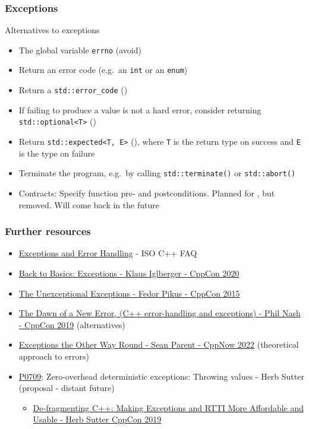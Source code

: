 \begin{frame}[fragile]
  \frametitle{Exceptions}
  \begin{block}{Alternatives to exceptions}
    \begin{itemize}
      \item The global variable \texttt{errno} (avoid)
      \item Return an error code (e.g.\ an \texttt{int} or an \texttt{enum})
      \item Return a \texttt{std::error_code} ()
      \item If failing to produce a value is not a hard error, consider returning \texttt{std::optional<T>} ()
      \item Return \texttt{std::expected<T, E>} (), where \texttt{T} is the return type on success and \texttt{E} is the type on failure
      \item Terminate the program, e.g.\ by calling \texttt{std::terminate()} or  \texttt{std::abort()}
      \item Contracts: Specify function pre- and postconditions. Planned for , but removed. Will come back in the future
    \end{itemize}
  \end{block}
\end{frame}

\begin{frame}[fragile]
  \frametitle{Further resources}
  \begin{block}{}
    \begin{itemize}
      \item \href{https://isocpp.org/wiki/faq/exceptions}{Exceptions and Error Handling} - ISO C++ FAQ
      \item \href{https://www.youtube.com/watch?v=0ojB8c0xUd8&t=1505s}{Back to Basics: Exceptions - Klaus Iglberger - CppCon 2020}
      \item \href{https://www.youtube.com/watch?v=fOV7I-nmVXw}{The Unexceptional Exceptions - Fedor Pikus - CppCon 2015}
      \item \href{https://www.youtube.com/watch?v=ZUH8p1EQswA}{The Dawn of a New Error, (C++ error-handling and exceptions) - Phil Nash - CppCon 2019} (alternatives)
      \item \href{https://www.youtube.com/watch?v=mkkaAWNE-Ig}{Exceptions the Other Way Round - Sean Parent - CppNow 2022} (theoretical approach to errors)
      \item \href{https://wg21.link/P0709}{P0709}: Zero-overhead deterministic exceptions: Throwing values - Herb Sutter (proposal - distant future)
      \begin{itemize}
        \item \href{https://www.youtube.com/watch?v=ARYP83yNAWk}{De-fragmenting C++: Making Exceptions and RTTI More Affordable and Usable - Herb Sutter CppCon 2019}
      \end{itemize}
    \end{itemize}
  \end{block}
\end{frame}
